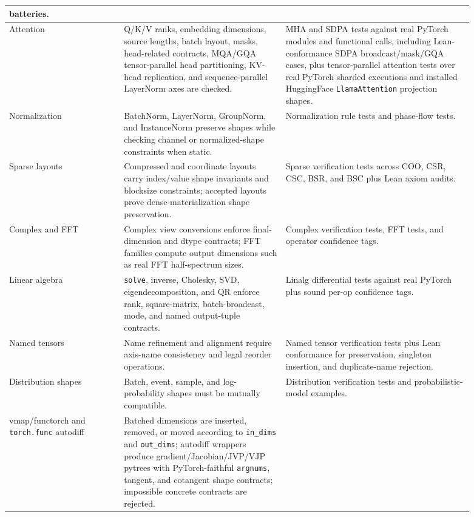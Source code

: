 \documentclass[11pt]{article}
\begin{document}
\begin{longtable}{|p{0.22\linewidth}|p{0.31\linewidth}|p{0.36\linewidth}|}
batteries. \\
\hline
Attention &
Q/K/V ranks, embedding dimensions, source lengths, batch layout, masks,
head-related contracts, MQA/GQA tensor-parallel head partitioning, KV-head
replication, and sequence-parallel LayerNorm axes are checked. &
MHA and SDPA tests against real PyTorch modules and functional calls, including
Lean-conformance SDPA broadcast/mask/GQA cases, plus
tensor-parallel attention tests over real PyTorch sharded executions and
installed HuggingFace \texttt{LlamaAttention} projection shapes. \\
\hline
Normalization &
BatchNorm, LayerNorm, GroupNorm, and InstanceNorm preserve shapes while checking
channel or normalized-shape constraints when static. &
Normalization rule tests and phase-flow tests. \\
\hline
Sparse layouts &
Compressed and coordinate layouts carry index/value shape invariants and
blocksize constraints; accepted layouts prove dense-materialization shape
preservation. &
Sparse verification tests across COO, CSR, CSC, BSR, and BSC plus Lean axiom
audits. \\
\hline
Complex and FFT &
Complex view conversions enforce final-dimension and dtype contracts; FFT
families compute output dimensions such as real FFT half-spectrum sizes. &
Complex verification tests, FFT tests, and operator confidence tags. \\
\hline
Linear algebra &
\texttt{solve}, inverse, Cholesky, SVD, eigendecomposition, and QR enforce
rank, square-matrix, batch-broadcast, mode, and named output-tuple contracts. &
Linalg differential tests against real PyTorch plus sound per-op confidence
tags. \\
\hline
Named tensors &
Name refinement and alignment require axis-name consistency and legal reorder
operations. &
Named tensor verification tests plus Lean conformance for preservation,
singleton insertion, and duplicate-name rejection. \\
\hline
Distribution shapes &
Batch, event, sample, and log-probability shapes must be mutually compatible. &
Distribution verification tests and probabilistic-model examples. \\
\hline
vmap/functorch and \texttt{torch.func} autodiff &
Batched dimensions are inserted, removed, or moved according to \texttt{in\_dims}
and \texttt{out\_dims}; autodiff wrappers produce gradient/Jacobian/JVP/VJP
pytrees with PyTorch-faithful \texttt{argnums}, tangent, and cotangent shape
contracts; impossible concrete contracts are rejected. &

\end{longtable}
\end{document}
